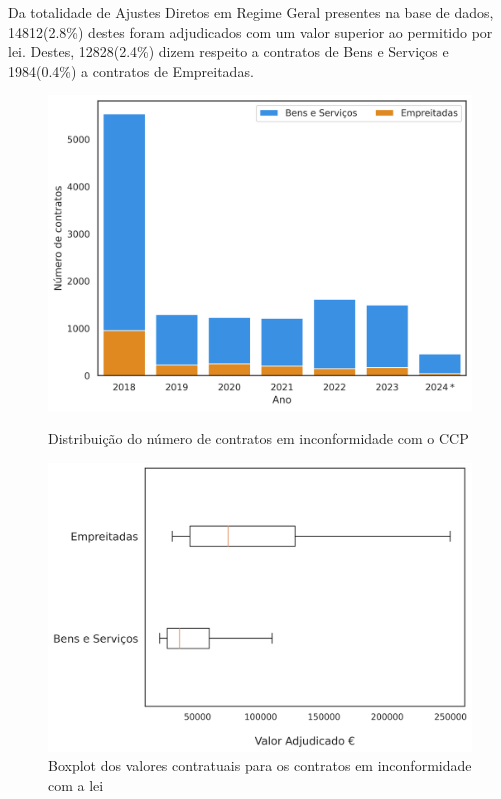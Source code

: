 Da totalidade de Ajustes Diretos em Regime Geral presentes na base de dados, 14812(2.8\%) destes foram adjudicados com um valor superior ao permitido por lei. Destes, 12828(2.4\%) dizem respeito a contratos de Bens e Serviços e 1984(0.4\%) a contratos de Empreitadas.


\begin{figure}[H]
	\centering
	\begin{minipage}{.45\linewidth}
		\includegraphics[width=\linewidth]{imagens/rf1/dist.png}
		\caption{Distribuição do número de contratos em inconformidade com o CCP}
		
	\end{minipage}
	\hfill
	\begin{minipage}{.5\linewidth}
		\includegraphics[width=\linewidth]{imagens/rf1/boxplot.png}
		\caption{Boxplot dos valores contratuais para os contratos em inconformidade com a lei}
		
	\end{minipage}
\end{figure}


